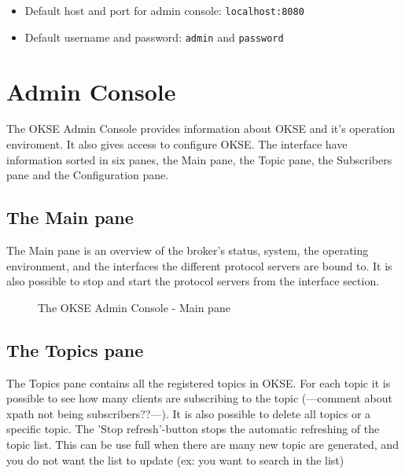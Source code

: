 \begin{itemize}
\setlength{\itemsep}{0cm}%
\item Default host and port for admin console: \verb!localhost:8080!
\item Default username and password: \verb!admin! and \verb!password!
\end{itemize}

\section{Admin Console}
The OKSE Admin Console provides information about OKSE and it's operation enviroment. It also gives access to configure OKSE. The interface have information sorted in six panes, the Main pane, the Topic pane, the Subscribers pane and the Configuration pane.

\subsection{The Main pane}
The Main pane is an overview of the broker's status, system, the operating environment, and the interfaces the different protocol servers are bound to. It is also possible to stop and start the protocol servers from the interface section.

\begin{center}
  \begin{figure}[ht!]
    \caption{The OKSE Admin Console - Main pane} 
    \label{fig:OKSE Admin Console - Main pane}
  \end{figure}
\end{center}

\subsection{The Topics pane}
The Topics pane contains all the registered topics in OKSE. For each topic it is possible to see how many clients are subscribing to the topic (---comment about xpath not being subscribers??---). It is also possible to delete all topics or a specific topic. The 'Stop refresh'-button stops the automatic refreshing of the topic list. This can be use full when there are many new topic are generated, and you do not want the list to update (ex: you want to search in the list)

